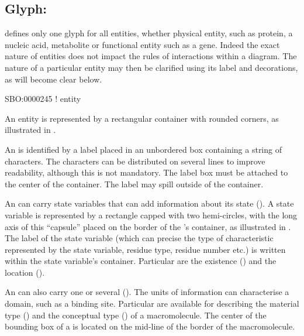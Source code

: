 \color{red}

\subsection{Glyph: }
\label{sec:entity}

\SBGNERLone defines only one glyph for all entities, whether physical entity, such as protein, a nucleic acid, metabolite or functional entity such as a gene. Indeed the exact nature of entities does not impact the rules of interactions within a diagram. The nature of a particular entity may then be clarified using its label and decorations, as will become clear below. 

\begin{glyphDescription}

\glyphSboTerm SBO:0000245 ! entity 

\glyphContainer An entity is represented by a rectangular container with rounded corners, as illustrated in .

\glyphLabel An  is identified by a label placed in an unbordered box containing a string of characters.  The characters can be distributed on several lines to improve readability, although this is not mandatory.  The label box must be attached to the center of the container.  The label may spill outside of the container.

\glyphAux An  can carry state variables that can add information about its state ().  A state variable is represented by a rectangle capped with two hemi-circles, with the long axis of this  ``capsule'' placed on the border of the 's container, as illustrated in .  The label of the state variable (which can precise the type of characteristic represented by the state variable, residue type, residue number etc.) is written within the state variable's container. Particular  are the existence () and the location ().

An  can also carry one or several  ().  The units of information can characterise a domain, such as a binding site.  Particular  are available for describing the material type () and the conceptual type () of a macromolecule.  The center of the bounding box of a  is located on the mid-line of the border of the macromolecule.

\end{glyphDescription}

